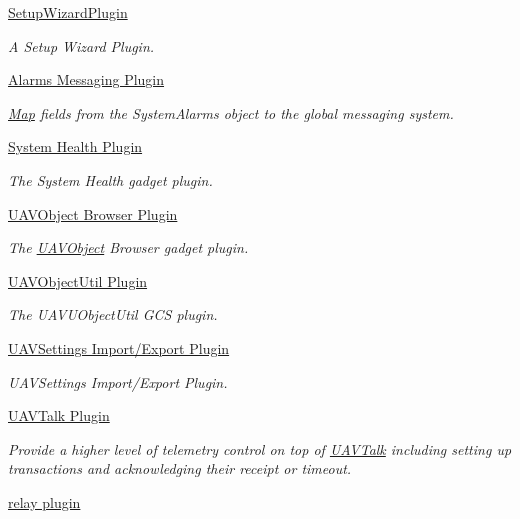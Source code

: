 \begin{DoxyCompactItemize}
\hyperlink{group___setup_wizard_plugin}{Setup\-Wizard\-Plugin}
\begin{DoxyCompactList}\small\item\em A Setup Wizard Plugin. \end{DoxyCompactList}\item 
\hyperlink{group___system}{Alarms Messaging Plugin}
\begin{DoxyCompactList}\small\item\em \hyperlink{class_map}{Map} fields from the System\-Alarms object to the global messaging system. \end{DoxyCompactList}\item 
\hyperlink{group___system_health_plugin}{System Health Plugin}
\begin{DoxyCompactList}\small\item\em The System Health gadget plugin. \end{DoxyCompactList}\item 
\hyperlink{group___u_a_v_object_browser_plugin}{U\-A\-V\-Object Browser Plugin}
\begin{DoxyCompactList}\small\item\em The \hyperlink{class_u_a_v_object}{U\-A\-V\-Object} Browser gadget plugin. \end{DoxyCompactList}\item 
\hyperlink{group___u_a_v_object_util_plugin}{U\-A\-V\-Object\-Util Plugin}
\begin{DoxyCompactList}\small\item\em The U\-A\-V\-U\-Object\-Util G\-C\-S plugin. \end{DoxyCompactList}\item 
\hyperlink{group___u_a_v_settings_import_export}{U\-A\-V\-Settings Import/\-Export Plugin}
\begin{DoxyCompactList}\small\item\em U\-A\-V\-Settings Import/\-Export Plugin. \end{DoxyCompactList}\item 
\hyperlink{group___u_a_v_talk_plugin}{U\-A\-V\-Talk Plugin}
\begin{DoxyCompactList}\small\item\em Provide a higher level of telemetry control on top of \hyperlink{class_u_a_v_talk}{U\-A\-V\-Talk} including setting up transactions and acknowledging their receipt or timeout. \end{DoxyCompactList}\item 
\hyperlink{group___u_a_v_talk}{relay plugin}

\end{DoxyCompactItemize}
